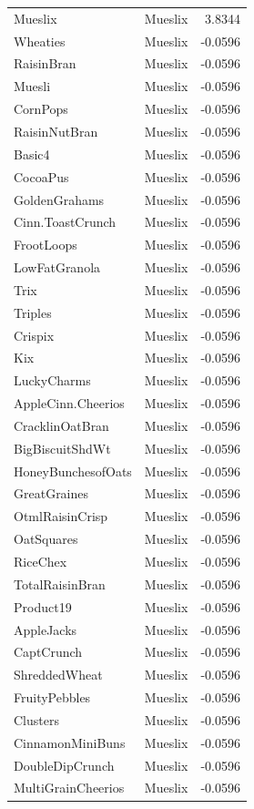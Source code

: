 \begin{longtable}{llr}
Mueslix & Mueslix & 3.8344 \\
Wheaties & Mueslix & -0.0596 \\
RaisinBran & Mueslix & -0.0596 \\
Muesli & Mueslix & -0.0596 \\
CornPops & Mueslix & -0.0596 \\
RaisinNutBran & Mueslix & -0.0596 \\
Basic4 & Mueslix & -0.0596 \\
CocoaPus & Mueslix & -0.0596 \\
GoldenGrahams & Mueslix & -0.0596 \\
Cinn.ToastCrunch & Mueslix & -0.0596 \\
FrootLoops & Mueslix & -0.0596 \\
LowFatGranola & Mueslix & -0.0596 \\
Trix & Mueslix & -0.0596 \\
Triples & Mueslix & -0.0596 \\
Crispix & Mueslix & -0.0596 \\
Kix & Mueslix & -0.0596 \\
LuckyCharms & Mueslix & -0.0596 \\
AppleCinn.Cheerios & Mueslix & -0.0596 \\
CracklinOatBran & Mueslix & -0.0596 \\
BigBiscuitShdWt & Mueslix & -0.0596 \\
HoneyBunchesofOats & Mueslix & -0.0596 \\
GreatGraines & Mueslix & -0.0596 \\
OtmlRaisinCrisp & Mueslix & -0.0596 \\
OatSquares & Mueslix & -0.0596 \\
RiceChex & Mueslix & -0.0596 \\
TotalRaisinBran & Mueslix & -0.0596 \\
Product19 & Mueslix & -0.0596 \\
AppleJacks & Mueslix & -0.0596 \\
CaptCrunch & Mueslix & -0.0596 \\
ShreddedWheat & Mueslix & -0.0596 \\
FruityPebbles & Mueslix & -0.0596 \\
Clusters & Mueslix & -0.0596 \\
CinnamonMiniBuns & Mueslix & -0.0596 \\
DoubleDipCrunch & Mueslix & -0.0596 \\
MultiGrainCheerios & Mueslix & -0.0596 \\

\end{longtable}
